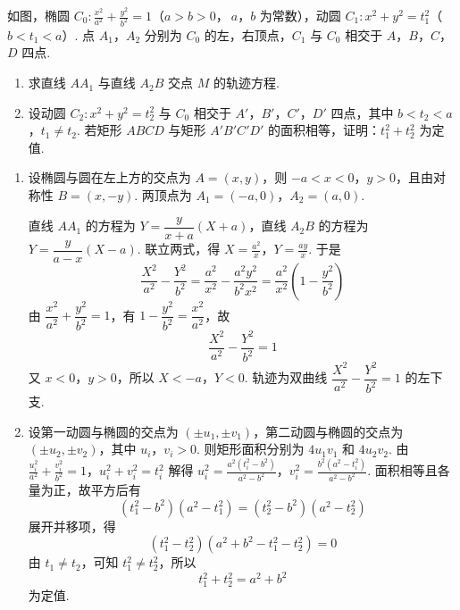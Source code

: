 \begin{problem}
如图，椭圆 \(C_{0}:\frac{x^{2}}{a^{2}} + \frac{y^{2}}{b^{2}} = 1\)（\(a > b > 0\)，\(\ a\)，\(b\) 为常数），动圆 \(C_1: x^2 + y^2 = t_1^2\)（\(b < t_1 < a\)）. 点 \(A_{1}\)，\(A_{2}\) 分别为 \(C_0\) 的左，右顶点，\(C_1\) 与 \(C_0\) 相交于 \(A\)，\(B\)，\(C\)，\(D\) 四点.

\begin{enumerate}
\item 求直线 \(AA_{1}\) 与直线 \(A_{2}B\) 交点 \(M\) 的轨迹方程.
\item 设动圆 \(C_{2}: x^{2} + y^{2} = t_{2}^{2}\) 与 \(C_{0}\) 相交于 \(A'\)，\(B'\)，\(C'\)，\(D'\) 四点，其中 \(b < t_{2} < a\)，\(t_{1} \neq t_{2}\). 若矩形 \(ABCD\) 与矩形 \(A'B'C'D'\) 的面积相等，证明：\(t_{1}^{2} + t_{2}^{2}\) 为定值.
\end{enumerate}

\end{problem}

\begin{solution}
\begin{enumerate}
\item 设椭圆与圆在左上方的交点为 \(A=(x,y)\)，则 \(-a<x<0\)，\(y>0\)，且由对称性 \(B=(x,-y)\). 两顶点为 \(A_1=(-a,0)\)，\(A_2=(a,0)\).

直线 \(AA_1\) 的方程为 \(Y=\dfrac{y}{x+a}(X+a)\)，直线 \(A_2B\) 的方程为 \(Y=\dfrac{y}{a-x}(X-a)\). 联立两式，得
\(X=\frac{a^2}{x}\)，\(Y=\frac{ay}{x}\).
于是
\[
\frac{X^2}{a^2}-\frac{Y^2}{b^2}
=\frac{a^2}{x^2}-\frac{a^2y^2}{b^2x^2}
=\frac{a^2}{x^2}\left(1-\frac{y^2}{b^2}\right)
\]
由 \(\dfrac{x^2}{a^2}+\dfrac{y^2}{b^2}=1\)，有 \(1-\dfrac{y^2}{b^2}=\dfrac{x^2}{a^2}\)，故
\[
\frac{X^2}{a^2}-\frac{Y^2}{b^2}=1
\]
又 \(x<0\)，\(y>0\)，所以 \(X<-a\)，\(Y<0\). 轨迹为双曲线 \(\dfrac{X^2}{a^2}-\dfrac{Y^2}{b^2}=1\) 的左下支.
\item 设第一动圆与椭圆的交点为 \((\pm u_1,\pm v_1)\)，第二动圆与椭圆的交点为 \((\pm u_2,\pm v_2)\)，其中 \(u_i\)，\(v_i>0\). 则矩形面积分别为 \(4u_1v_1\) 和 \(4u_2v_2\). 由
\(\frac{u_i^2}{a^2}+\frac{v_i^2}{b^2}=1\)，\(u_i^2+v_i^2=t_i^2\)
解得
\(u_i^2=\frac{a^2(t_i^2-b^2)}{a^2-b^2}\)，\(v_i^2=\frac{b^2(a^2-t_i^2)}{a^2-b^2}\).
面积相等且各量为正，故平方后有
\[
(t_1^2-b^2)(a^2-t_1^2)=(t_2^2-b^2)(a^2-t_2^2)
\]
展开并移项，得
\[
(t_1^2-t_2^2)(a^2+b^2-t_1^2-t_2^2)=0
\]
由 \(t_1\ne t_2\)，可知 \(t_1^2\ne t_2^2\)，所以
\[
t_1^2+t_2^2=a^2+b^2
\]
为定值.
\end{enumerate}
\end{solution}


